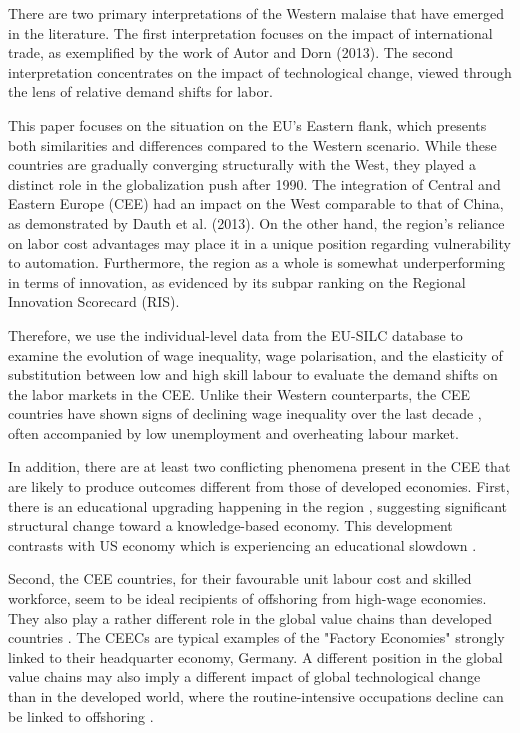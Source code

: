 \documentclass[11pt]{article}
\begin{document}
There are two primary interpretations of the Western malaise that have emerged in the literature. The first interpretation focuses on the impact of international trade, as exemplified by the work of Autor and Dorn (2013). The second interpretation concentrates on the impact of technological change, viewed through the lens of relative demand shifts for labor. 

This paper focuses on the situation on the EU's Eastern flank, which presents both similarities and differences compared to the Western scenario. While these countries are gradually converging structurally with the West, they played a distinct role in the globalization push after 1990. The integration of Central and Eastern Europe (CEE) had an impact on the West comparable to that of China, as demonstrated by Dauth et al. (2013). On the other hand, the region's reliance on labor cost advantages may place it in a unique position regarding vulnerability to automation. Furthermore, the region as a whole is somewhat underperforming in terms of innovation, as evidenced by its subpar ranking on the Regional Innovation Scorecard (RIS).


Therefore, we use the individual-level data from the EU-SILC database to examine the evolution of wage inequality, wage polarisation, and the elasticity of substitution between low and high skill labour to evaluate the demand shifts on the labor markets in the CEE. Unlike their Western counterparts, the CEE countries have shown signs of declining wage inequality over the last decade \citep{magda2021firms}, often accompanied by low unemployment and overheating labour market.

In addition, there are at least two conflicting phenomena present in the CEE that are likely to produce outcomes different from those of developed economies. First, there is an educational upgrading happening in the region \citep{hardy2018educational}, suggesting significant structural change toward a knowledge-based economy. This development contrasts with US economy which is experiencing an educational slowdown \citep{goldin2010race}.

Second, the CEE countries, for their favourable unit labour cost and skilled workforce, seem to be ideal recipients of offshoring from high-wage economies. They also play a rather different role in the global value chains than developed countries \citep{baldwin2015supply}. The CEECs are typical examples of the "Factory Economies" strongly linked to their headquarter economy, Germany. 
A different position in the global value chains may also imply a different impact of global technological change than in the developed world, where the routine-intensive occupations decline can be linked to offshoring \citep{acemoglu2012does}.
\end{document}
